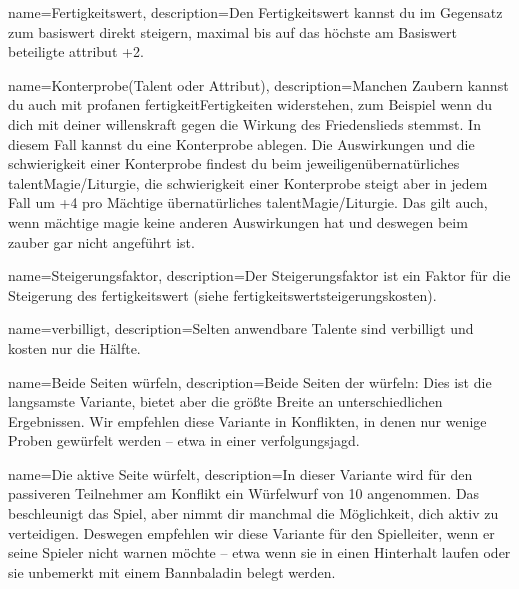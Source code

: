     
    


        
    
    
    
        
        

{
    name={Fertigkeitswert},
    description={Den Fertigkeitswert kannst du im Gegensatz zum \gls{basiswert} direkt steigern, maximal bis auf das höchste am Basiswert beteiligte \gls{attribut} +2.}}

{
    name={Konterprobe(Talent oder Attribut)},
    description={Manchen Zaubern kannst du auch mit profanen \gls{fertigkeit}{Fertigkeiten} widerstehen, zum Beispiel wenn du dich mit deiner \gls{willenskraft} gegen die Wirkung des Friedenslieds stemmst. In diesem Fall kannst du eine Konterprobe ablegen. Die Auswirkungen und die \gls{schwierigkeit} einer Konterprobe findest du beim jeweiligen\gls{übernatürliches talent}{Magie/Liturgie}, die \gls{schwierigkeit} einer Konterprobe steigt aber in jedem Fall um +4 pro Mächtige \gls{übernatürliches talent}{Magie/Liturgie}. Das gilt auch, wenn \gls{mächtige magie} keine anderen Auswirkungen hat und deswegen beim \gls{zauber} gar nicht angeführt ist.}}

{
    name={Steigerungsfaktor},
    description={Der Steigerungsfaktor ist ein Faktor für die Steigerung des \gls{fertigkeitswert} (siehe \gls{fertigkeitswertsteigerungskosten}).}}

{
    name={verbilligt},
    description={Selten anwendbare Talente sind verbilligt und kosten
nur die Hälfte.}}
        

{
    name={Beide Seiten würfeln},
    description={Beide Seiten der  würfeln: Dies ist die langsamste Variante, bietet aber die größte Breite an unterschiedlichen Ergebnissen. Wir empfehlen diese Variante in Konflikten, in denen nur wenige Proben gewürfelt werden – etwa in einer \gls{verfolgungsjagd}.}}

{
    name={Die aktive Seite würfelt},
    description={In dieser Variante wird für den passiveren Teilnehmer am Konflikt ein Würfelwurf von 10 angenommen. Das beschleunigt das Spiel, aber nimmt dir manchmal die Möglichkeit, dich aktiv zu verteidigen. Deswegen empfehlen wir diese Variante für den Spielleiter, wenn er seine Spieler nicht warnen möchte – etwa wenn sie in einen Hinterhalt laufen oder sie unbemerkt mit einem Bannbaladin belegt werden.}}

